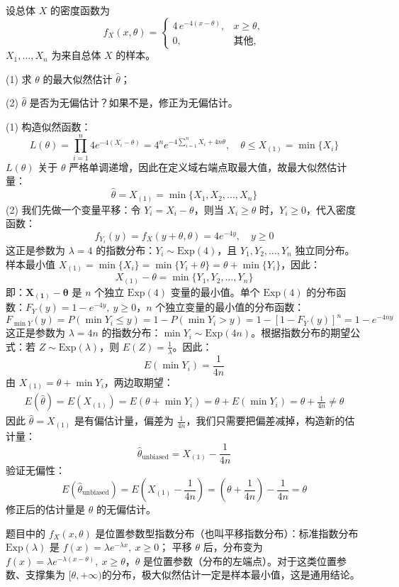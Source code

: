\documentclass[lang=cn,11pt]{elegantbook}
\begin{document}
\begin{exercise}\label{exer:7-exp4-shift}
设总体 \(X\) 的密度函数为
\[
f_X(x,\theta) = \begin{cases} 4\,e^{-4(x-\theta)}, & x \geq \theta, \\ 0, & \text{其他}, \end{cases}
\]
\(X_1, \dots, X_n\) 为来自总体 \(X\) 的样本。\par
(1) 求 \(\theta\) 的最大似然估计 \(\hat{\theta}\)；\par
(2) \(\hat{\theta}\) 是否为无偏估计？如果不是，修正为无偏估计。
\end{exercise}
\begin{solution}
(1) 构造似然函数：
$$L(\theta) = \prod_{i=1}^n 4 e^{-4(X_i-\theta)} = 4^n e^{-4\sum_{i=1}^n X_i + 4n\theta}, \quad \theta \leq X_{(1)} = \min\{X_i\}$$
$L(\theta)$ 关于 $\theta$ 严格单调递增，因此在定义域右端点取最大值，故最大似然估计量：
$$\hat{\theta} = X_{(1)} = \min\{X_1,X_2,\dots,X_n\}$$
(2) 我们先做一个变量平移：令 $Y_i = X_i - \theta$，则当 $X_i \geq \theta$ 时，$Y_i \geq 0$，代入密度函数：
  $$  f_{Y_i}(y) = f_X(y+\theta,\theta) = 4 e^{-4y}, \quad y \geq 0  $$
  这正是参数为 $\lambda=4$ 的指数分布：$Y_i \sim \text{Exp}(4)$，且 $Y_1,Y_2,\dots,Y_n$ 独立同分布。
样本最小值 $X_{(1)} = \min\{X_i\} = \min\{Y_i+\theta\} = \theta + \min\{Y_i\}$，因此：
  $$  X_{(1)} - \theta = \min\{Y_1,Y_2,\dots,Y_n\}  $$
  即：$\boldsymbol{X_{(1)} - \theta}$ 是 $n$ 个独立 $\text{Exp}(4)$ 变量的最小值。单个 $\text{Exp}(4)$ 的分布函数：$F_Y(y) = 1 - e^{-4y},\ y\geq0$，$n$ 个独立变量的最小值的分布函数：
  $$  F_{\min Y}(y) = P(\min Y_i \leq y) = 1 - P(\min Y_i > y) = 1 - [1-F_Y(y)]^n = 1 - e^{-4ny}  $$
  这正是参数为 $\lambda=4n$ 的指数分布：$\min Y_i \sim \text{Exp}(4n)$。根据指数分布的期望公式：若 $Z \sim \text{Exp}(\lambda)$，则 $E(Z) = \frac{1}{\lambda}$。因此：
  $$  E\left(\min Y_i\right) = \frac{1}{4n}  $$
由 $X_{(1)} = \theta + \min Y_i$，两边取期望：
\begin{align*}
E(\hat{\theta}) = E(X_{(1)}) = E\left(\theta + \min Y_i\right) = \theta + E\left(\min Y_i\right) = \theta + \frac{1}{4n}\neq \theta
\end{align*}
因此 $\hat{\theta} = X_{(1)}$ 是有偏估计量，偏差为 $\frac{1}{4n}$，我们只需要把偏差减掉，构造新的估计量：
$$
\hat{\theta}_{\text{unbiased}} = X_{(1)} - \frac{1}{4n}
$$
验证无偏性：
$$
E\left(\hat{\theta}_{\text{unbiased}}\right) = E\left(X_{(1)} - \frac{1}{4n}\right) = \left(\theta + \frac{1}{4n}\right) - \frac{1}{4n} = \theta
$$
修正后的估计量是 $\theta$ 的无偏估计。
\end{solution}
\begin{note}
题目中的 $f_X(x,\theta)$ 是位置参数型指数分布（也叫平移指数分布）：标准指数分布 $\text{Exp}(\lambda)$ 是 $f(x) = \lambda e^{-\lambda x},\ x\geq0$； 平移 $\theta$ 后，分布变为 $f(x) = \lambda e^{-\lambda(x-\theta)},\ x\geq\theta$，$\theta$ 是位置参数（分布的左端点）。对于这类位置参数、支撑集为 $[\theta,+\infty)$的分布，极大似然估计一定是样本最小值，这是通用结论。
\end{note}
\end{document}
